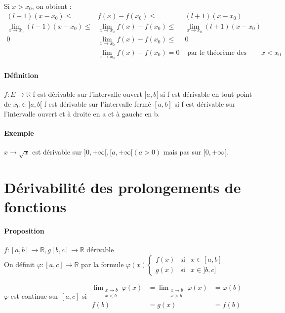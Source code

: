 	Si $x > x_0$, on obtient : \[ \begin{array}{rcl}
			(l-1)(x-x_0) \leq & f(x) - f(x_0) \leq & (l+1)(x-x_0) \\
			\lim_{x \to x_0} (l-1)(x-x_0) \leq & \lim_{x \to x_0}f(x) - f(x_0) \leq & \lim_{x \to x_0}(l+1)(x-x_0) \\
			0 & \lim_{x \to x_0}f(x) - f(x_0) \leq & 0 \\
			  & \lim_{x \to x_0}f(x) - f(x_0) = 0 & \text{ par le théorème des gendarmes, et de même pour } x < x_0 \end{array} \]


\paragraph{Définition} $f:E \rightarrow \mathbb{R}$ 
f est dérivable sur l'intervalle ouvert $]a, b[$ si f est dérivable en tout point de $x_0 \in ]a, b[$
f est dérivable sur l'intervalle fermé $[a, b]$ si f est dérivable sur l'intervalle ouvert et à droite en a et à gauche en b.

\paragraph{Exemple} $x \to \sqrt{x}$ est dérivable sur $]0, +\infty[, [a, +\infty[ (a > 0)$ mais pas sur $[0, +\infty[$.

\section{Dérivabilité des prolongements de fonctions}
\paragraph{Proposition} $f:[a, b] \rightarrow \mathbb{R}, g [b, c] \rightarrow \mathbb{R}$ dérivable ~\\
On définit $\varphi : [a, c] \rightarrow \mathbb{R}$ par la formule $\varphi(x) \left\{ \begin{array}{rcl}
		f(x) & \text{si} & x \in [a, b] \\
		g(x) & \text{si} & x \in ]b, c] 
	\end{array}
	\right.$

	$\varphi $ est continue sur $[a, c]$ si $\begin{array}{rcl} 
		\lim_{\substack{x \to b \\ x < b}}\varphi (x) &= \lim_{\substack{x \to b \\ x > b}}\varphi (x) &= \varphi(b) \\
		f(b) &= g(x) & = f(b) 
		\end{array}$

